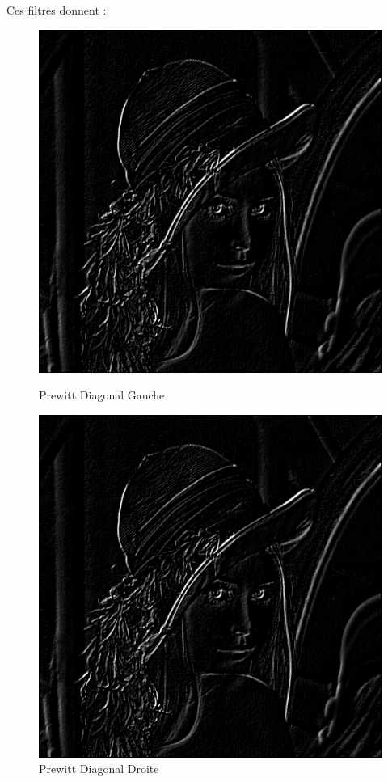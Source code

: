 \documentclass[11pt]{article}
\begin{document}
	Ces filtres donnent : 

	\begin{figure}[H]
		\begin{minipage}[c]{.46\linewidth}
			\centering
			\includegraphics[scale=0.25]{Image/filtrePrewittDiagonalG.png}
			\caption{Prewitt Diagonal Gauche}
			\label{fig:PrewittDiagonalG}
		\end{minipage} \hfill
		\begin{minipage}[c]{.46\linewidth}
		\centering
			\includegraphics[scale=0.25]{Image/filtrePrewittDiagonalD.png}
			\caption{Prewitt Diagonal Droite}
			\label{fig:SobelDiagonalD}
		\end{minipage}
	\end{figure}
\end{document}

